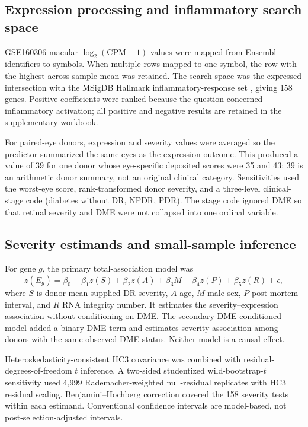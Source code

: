 \documentclass[12pt]{article}
\begin{document}
\subsection{Expression processing and inflammatory search space}

GSE160306 macular $\log_2(\mathrm{CPM}+1)$ values were mapped from Ensembl identifiers to symbols. When multiple rows mapped to one symbol, the row with the highest across-sample mean was retained. The search space was the expressed intersection with the MSigDB Hallmark inflammatory-response set \citep{Liberzon2015}, giving 158 genes. Positive coefficients were ranked because the question concerned inflammatory activation; all positive and negative results are retained in the supplementary workbook.

For paired-eye donors, expression and severity values were averaged so the predictor summarized the same eyes as the expression outcome. This produced a value of 39 for one donor whose eye-specific deposited scores were 35 and 43; 39 is an arithmetic donor summary, not an original clinical category. Sensitivities used the worst-eye score, rank-transformed donor severity, and a three-level clinical-stage code (diabetes without DR, NPDR, PDR). The stage code ignored DME so that retinal severity and DME were not collapsed into one ordinal variable.

\subsection{Severity estimands and small-sample inference}

For gene $g$, the primary total-association model was
\[
z(E_g)=\beta_0+\beta_1z(S)+\beta_2z(A)+\beta_3M+\beta_4z(P)+\beta_5z(R)+\epsilon,
\]
where $S$ is donor-mean supplied DR severity, $A$ age, $M$ male sex, $P$ post-mortem interval, and $R$ RNA integrity number. It estimates the severity--expression association without conditioning on DME. The secondary DME-conditioned model added a binary DME term and estimates severity association among donors with the same observed DME status. Neither model is a causal effect.

Heteroskedasticity-consistent HC3 covariance was combined with residual-degrees-of-freedom $t$ inference. A two-sided studentized wild-bootstrap-$t$ sensitivity used 4,999 Rademacher-weighted null-residual replicates with HC3 residual scaling. Benjamini--Hochberg correction covered the 158 severity tests within each estimand. Conventional confidence intervals are model-based, not post-selection-adjusted intervals.
\end{document}
